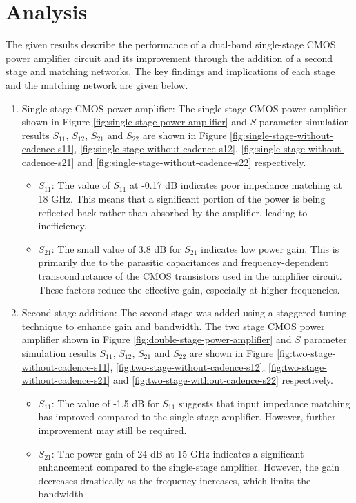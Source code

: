 \section{Analysis}
The given results describe the performance of a dual-band single-stage CMOS power amplifier circuit and its improvement through the addition of a second stage and matching networks. The key findings and implications of each stage and the matching network are given below.
\begin{enumerate}
\item Single-stage CMOS power amplifier:
The single stage CMOS power amplifier shown in Figure \ref{fig:single-stage-power-amplifier} and $S$ parameter simulation results $S_{11}$, $S_{12}$, $S_{21}$ and $S_{22}$ are shown in Figure \ref{fig:single-stage-without-cadence-s11}, \ref{fig:single-stage-without-cadence-s12}, \ref{fig:single-stage-without-cadence-s21} and \ref{fig:single-stage-without-cadence-s22} respectively.
    \begin{itemize}
       \item $S_{11}$: The value of $S_{11}$ at -0.17 dB indicates poor impedance matching at 18 GHz. This means that a significant portion of the power is being reflected back rather than absorbed by the amplifier, leading to inefficiency.
       \item $S_{21}$: The small value of 3.8 dB for $S_{21}$ indicates low power gain. This is primarily due to the parasitic capacitances and frequency-dependent transconductance of the CMOS transistors used in the amplifier circuit. These factors reduce the effective gain, especially at higher frequencies.
    \end{itemize}
\item Second stage addition:
The second stage was added using a staggered tuning technique to enhance gain and bandwidth.
The two stage CMOS power amplifier shown in Figure \ref{fig:double-stage-power-amplifier} and $S$ parameter simulation results $S_{11}$, $S_{12}$, $S_{21}$ and $S_{22}$ are shown in Figure \ref{fig:two-stage-without-cadence-s11}, \ref{fig:two-stage-without-cadence-s12}, \ref{fig:two-stage-without-cadence-s21} and \ref{fig:two-stage-without-cadence-s22} respectively.
    \begin{itemize}
        \item $S_{11}$: The value of -1.5 dB for $S_{11}$ suggests that input impedance matching has improved compared to the single-stage amplifier. However, further improvement may still be required.
        \item $S_{21}$: The power gain of 24 dB at 15 GHz indicates a significant enhancement compared to the single-stage amplifier. However, the gain decreases drastically as the frequency increases, which limits the bandwidth
    \end{itemize}


\end{enumerate}
